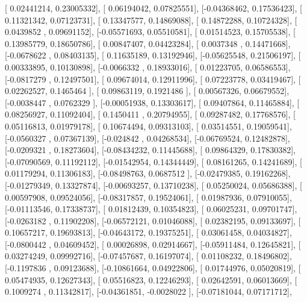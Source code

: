 \documentclass{article}
\begin{document}
       [ 0.02441214,  0.23005332],
       [ 0.06194042,  0.07825551],
       [-0.04368462,  0.17536423],
       [ 0.11321342,  0.07123731],
       [ 0.13347577,  0.14869088],
       [ 0.14872288,  0.10724328],
       [ 0.0439852 ,  0.09691152],
       [-0.05571693,  0.05510581],
       [ 0.01514523,  0.15705538],
       [ 0.13985779,  0.18650786],
       [ 0.00847407,  0.04423284],
       [ 0.0037348 ,  0.14471668],
       [-0.0678622 ,  0.08403135],
       [ 0.11635189,  0.13192946],
       [-0.05625548,  0.21506197],
       [ 0.00333895,  0.10130898],
       [-0.0066332 ,  0.18933016],
       [ 0.01223705,  0.06586553],
       [-0.0817279 ,  0.12497501],
       [ 0.09674014,  0.12911996],
       [ 0.07223778,  0.03419467],
       [ 0.02262527,  0.1465464 ],
       [ 0.09863119,  0.1921486 ],
       [ 0.00567326,  0.06679552],
       [-0.0038447 ,  0.0762329 ],
       [-0.00051938,  0.13303617],
       [ 0.09407864,  0.11465884],
       [ 0.08256927,  0.11092404],
       [ 0.1450411 ,  0.20794955],
       [ 0.09287482,  0.17768576],
       [ 0.05116813,  0.01979178],
       [ 0.10674494,  0.09313103],
       [ 0.03514551,  0.19059541],
       [-0.0560327 ,  0.07367139],
       [-0.024842  ,  0.04268534],
       [-0.06769524,  0.12482878],
       [-0.0209321 ,  0.18273604],
       [-0.08434232,  0.11445688],
       [ 0.09864329,  0.17830382],
       [-0.07090569,  0.11192112],
       [-0.01542954,  0.14344449],
       [ 0.08161265,  0.14241689],
       [ 0.01179294,  0.11306183],
       [-0.08498763,  0.0687512 ],
       [-0.02479385,  0.19162268],
       [-0.01279349,  0.13327874],
       [-0.00693257,  0.13710238],
       [ 0.05250024,  0.05686388],
       [ 0.00597908,  0.09524056],
       [-0.08317857,  0.19524061],
       [ 0.01987936,  0.07910055],
       [-0.01113546,  0.17338737],
       [ 0.01812439,  0.10354823],
       [ 0.06025231,  0.09701747],
       [-0.0263182 ,  0.11902208],
       [-0.06572121,  0.01046088],
       [ 0.02382195,  0.09133697],
       [ 0.10657217,  0.19693813],
       [-0.04643172,  0.19375251],
       [ 0.03061458,  0.04034827],
       [-0.0800442 ,  0.04609452],
       [ 0.00026898,  0.02914667],
       [-0.05911484,  0.12645821],
       [ 0.03274249,  0.09992716],
       [-0.07457687,  0.16197074],
       [ 0.01108232,  0.18496802],
       [-0.1197836 ,  0.09123688],
       [-0.10861664,  0.04922806],
       [ 0.01744976,  0.05020819],
       [ 0.05474935,  0.12627343],
       [ 0.05516823,  0.12246293],
       [ 0.02642591,  0.06013669],
       [ 0.1009274 ,  0.11342817],
       [-0.04361851, -0.0028022 ],
       [-0.07181044,  0.07171712],
\end{document}
